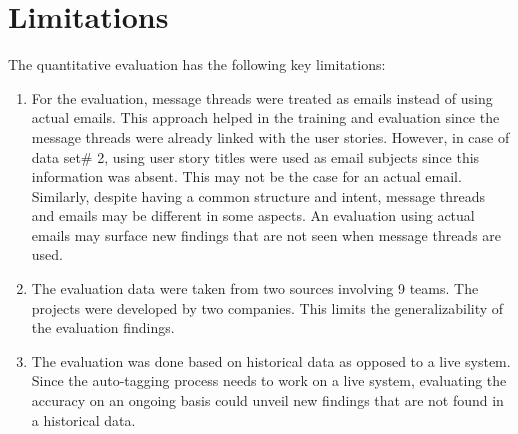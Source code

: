 \section{Limitations}
The quantitative evaluation has the following key limitations:

\begin{enumerate}
	\item For the evaluation, message threads were treated as emails instead of using actual emails. This approach helped in the training and evaluation since the message threads were already linked with the user stories. However, in case of data set\# 2, using user story titles were used as email subjects since this information was absent. This may not be the case for an actual email. Similarly, despite having a common structure and intent, message threads and emails may be different in some aspects. An evaluation using actual emails may surface new findings that are not seen when message threads are used.

	\item The evaluation data were taken from two sources involving 9 teams. The projects were developed by two companies. This limits the generalizability of the evaluation findings.
	
	\item The evaluation was done based on historical data as opposed to a live system. Since the auto-tagging process needs to work on a live system, evaluating the accuracy on an ongoing basis could unveil new findings that are not found in a historical data. 
	
\end{enumerate}


	
